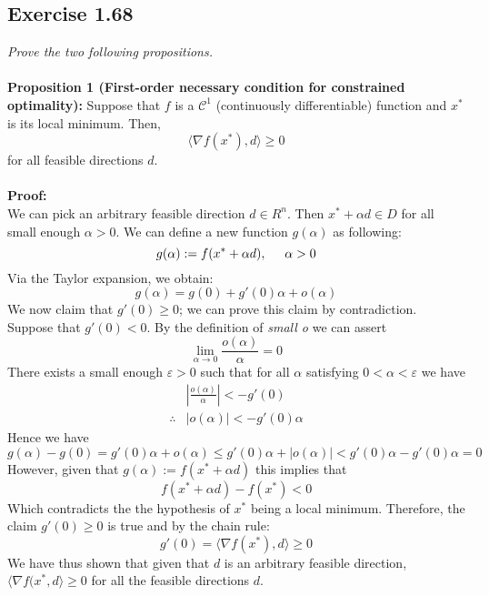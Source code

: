 \subsection{Exercise 1.68}
\emph{Prove the two following propositions.}\\
\\
\textbf{Proposition 1 (First-order necessary condition for constrained optimality):} Suppose that $f$ is a $ \mathcal{C}^1$ (continuously differentiable) function and $x^*$ is its local minimum. Then,
\begin{equation}
    \langle \nabla f (x^*), d  \rangle \geq 0
\end{equation}
for all feasible directions $d$.\\
\\
\textbf{Proof:} 
\\
We can pick an arbitrary feasible direction $d \in R^n$. Then $ x^* + \alpha d \in D$ for all small enough $\alpha > 0$. We can define a new function $g(\alpha)$ as following:
\begin{equation}
    g(\alpha) := f(x^* + \alpha d), \hspace{0.5cm} \alpha > 0
\end{equation}
Via the Taylor expansion, we obtain:
\begin{equation}
    g(\alpha) = g(0) + g'(0)\alpha + o(\alpha)
\end{equation}
We now claim that $g'(0) \geq 0$; we can prove this claim by contradiction.\\
Suppose that $g'(0) <  0$. By the definition of \emph{small o} we can assert
\begin{equation}
    \lim_{\alpha \to 0} \frac{o(\alpha)}{\alpha} = 0
\end{equation}
There exists a small enough $\varepsilon > 0$ such that for all $\alpha$ satisfying $0 < \alpha < \varepsilon$ we have
\begin{align}
    &\left| \frac{o(\alpha)}{\alpha} \right|< - g'(0) \\ 
    \therefore &\left| o(\alpha) \right|< -g'(0)\alpha
\end{align}
Hence we have
\begin{equation}
    g(\alpha) - g(0) = g'(0) \alpha + o(\alpha) \leq  g'(0) \alpha + \left| o(\alpha) \right| < g'(0) \alpha - g'(0) \alpha = 0
\end{equation}
However, given that $g(\alpha) := f(x^* + \alpha d)$ this implies that
\begin{equation}
    f(x^* + \alpha d) - f(x^*) < 0
\end{equation}
Which contradicts the the hypothesis of $x^*$ being a local minimum. Therefore, the claim $g'(0) \geq 0$ is true and by the chain rule:
\begin{equation}
    g'(0) = \langle \nabla f(x^*), d \rangle \geq 0
\end{equation}
We have thus shown that given that $d$ is an arbitrary feasible direction, $\langle \nabla f(x^*, d \rangle \geq 0$ for all the feasible directions $d$.



